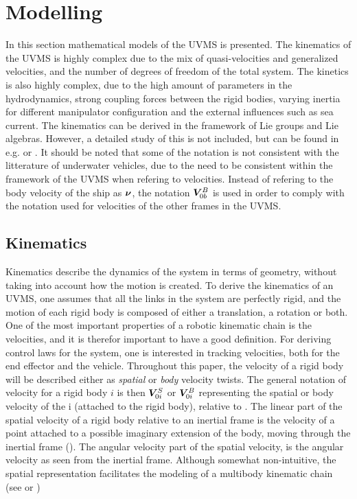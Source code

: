 
\section{Modelling}
\label{sec:modelling}

In this section mathematical models of the UVMS is presented. The kinematics of the UVMS is highly complex due to the mix of quasi-velocities and generalized velocities, and the number of degrees of freedom of the total system. 
The kinetics is also highly complex, due to the high amount of parameters in the hydrodynamics, strong coupling forces between the rigid bodies, varying inertia for different manipulator configuration and the external influences such as sea current. The kinematics can be derived in the framework of Lie groups and Lie algebras. However, a detailed study of this is not included, but can be found in e.g. \cite{bullo1} or \cite{shankar1}. It should be noted that some of the notation is not consistent with the  litterature of underwater vehicles, due to the need to be consistent within the framework of the UVMS when refering to velocities. Instead of refering to the body velocity of the ship as $ \boldsymbol \nu$, the notation $ \boldsymbol V_{0b}^B$ is used in order to comply with the notation used for velocities of the other frames in the UVMS. 



\subsection{Kinematics}
Kinematics describe the dynamics of the system in terms of geometry, without taking into account how the motion is created. To derive the kinematics of an UVMS, one assumes that all the links in the system are perfectly rigid, and the motion of each rigid body is composed of either a translation, a rotation or both. One of the most important properties of a robotic kinematic chain is the velocities, and it is therefor important to have a good definition. For deriving control laws for the system, one is interested in tracking velocities, both for the end effector and the vehicle. Throughout this paper, the velocity of a rigid body  will be described either as \textit{spatial} or \textit{body} velocity twists. The general notation of velocity for a rigid body $i$ is then $\boldsymbol V_{0i}^S$ or $\boldsymbol V_{0i}^B$ representing the spatial or body velocity of the \frame i (attached to the rigid body), relative to . The linear part of the spatial velocity of a rigid body relative to an inertial frame is the velocity of a point attached to a possible imaginary extension of the body, moving through the inertial frame (\cite{kristin_jant}). The angular velocity part of the spatial velocity, is the angular velocity as seen from the inertial frame. Although somewhat non-intuitive, the spatial representation facilitates the modeling of a multibody kinematic chain (see \cite{featherstone} or \cite{shankar1}) 


